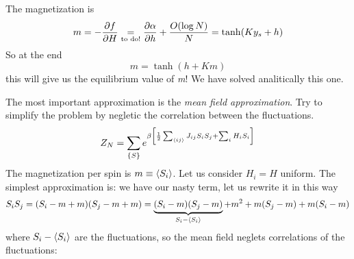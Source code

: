 \documentclass[../main/main.tex]{subfiles}
\begin{document}
The magnetization is
\begin{equation}
  m = - \pdv{f}{H} \underset{\text{to do!}}{=}  \pdv{\alpha }{h}  + \frac{O ( \log{N} )}{N}
  = \tanh (K y_s +h)
\end{equation}
So at the end
\begin{equation}
  m = \tanh (h+Km)
\end{equation}
this will give us the equilibrium value of \emph{m}! We have solved analitically this one.


The most important approximation is the \emph{mean field approximation}. Try to simplify the problem by negletic the correlation between the fluctuations.
\begin{equation}
  Z_N = \sum_{\{ S \}  }^{} e^{\beta \qty[\frac{1}{2} \sum_{\expval{ij} }^{} J_{ij} S_i S_j + \sum_{i}^{} H_i S_i   ] }
\end{equation}
The magnetization per spin is \( m \equiv \expval{S_i}  \). Let us consider \( H_i = H \) uniform. The simplest approximation is:
we have our nasty term, let us rewrite it in this way
\begin{equation}
  S_i S_j = (S_i - m + m) (S_j - m + m) = \underbrace{(S_i - m ) (S_j - m)}_{S_i - \expval{S_i} }  + m^2 + m (S_j-m) + m (S_i-m)
\end{equation}
where \( S_i - \expval{S_i}  \) are the fluctuations, so the mean field neglets correlations of the fluctuations:
\end{document}
